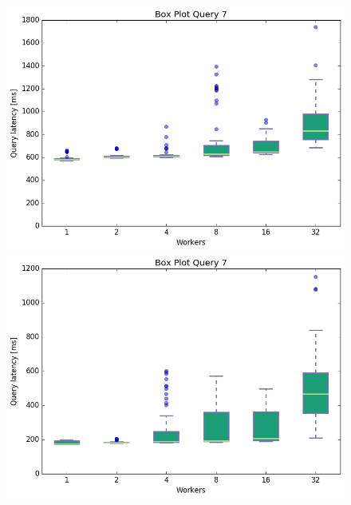 \documentclass[11pt,singlecolumn]{scrartcl}
\begin{document}
\begin{figure}[!tbp]
  \centering
  \RawFloats
  \begin{minipage}[b]{0.5\textwidth}
    \includegraphics[width=\textwidth]{boxesjl/q7}
  \end{minipage}
  \hfill
  \begin{minipage}[b]{0.5\textwidth}
    \includegraphics[width=\textwidth]{boxesjs/q7}
  \end{minipage}
\end{figure}
\clearpage
\end{document}
